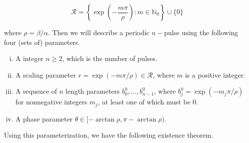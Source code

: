 \documentclass[12pt]{article}
\def\N{{\mathbb N}}
\begin{document}
\begin{equation}\label{setR}
\mathcal{R} = \left\{ \exp\left(-\frac{m \pi}{\rho}\right) : m \in \N_0 \right\} \cup \{ 0 \}
\end{equation}

where $\rho = \beta / \alpha$. Then we will describe a periodic $n-$pulse using the following four (sets of) parameters. 

\begin{enumerate}[(i)]
\item A integer $n \geq 2$, which is the number of pulses.
\item A scaling parameter $r = \exp(-m \pi / \rho ) \in \mathcal{R}$, where $m$ is a positive integer.
\item A sequence of $n$ length parameters $b_0^0, \dots, b_{n-1}^0$, where $b_j^0 = \exp(-m_j \pi / \rho )$ for nonnegative integers $m_j$, at least one of which must be 0.
\item A phase parameter $\theta \in [-\arctan \rho, \pi - \arctan \rho)$.
\end{enumerate}

Using this parameterization, we have the following existence theorem.
\end{document}
